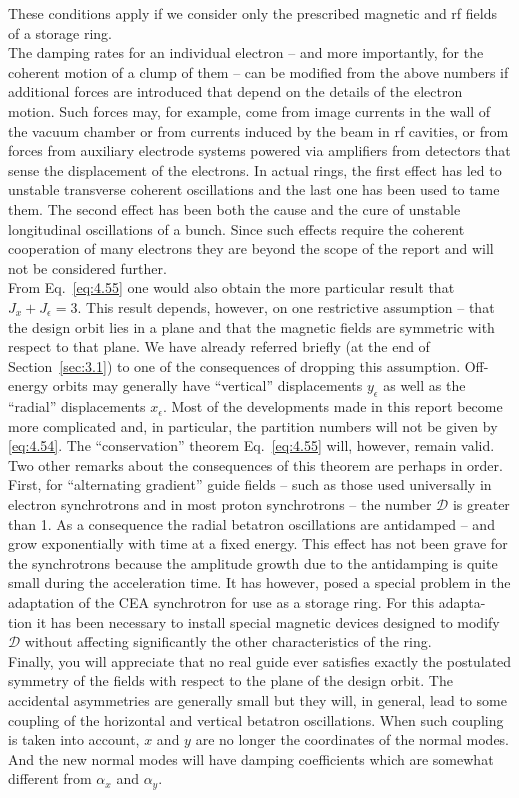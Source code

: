 \documentclass[../sands-adaptation.tex]{subfiles}
\begin{document}
 These conditions apply if we consider only the prescribed magnetic and rf fields of a storage ring.\\
The damping rates for an individual electron -- and more importantly, for the coherent motion of a clump of them -- can be modified from the above numbers if additional forces are introduced
 that depend on the details of the electron motion. Such forces may, for example, come from image currents in the wall of the vacuum chamber or from currents induced by the beam in rf cavities, or from forces from auxiliary electrode systems powered via amplifiers from detectors that sense the displacement of the electrons. In actual rings, the first effect has led to unstable transverse coherent oscillations and the last one has been used to tame them. The
second effect has been both the cause and the cure of unstable longitudinal oscillations of a bunch. Since such effects require the coherent cooperation of many electrons they are beyond the scope of the report and will not be considered further.\\
From Eq.~\eqref{eq:4.55} one would also obtain the more particular result that $J_x+ J_\epsilon = 3$. This result depends, however, on one restrictive assumption -- that the design orbit lies in a plane and that the magnetic fields are symmetric with respect to that plane. We have already referred briefly (at the end of Section~\ref{sec:3.1}) to one of the consequences of dropping this assumption. Off-energy orbits may generally have ``vertical'' displacements $y_\epsilon$ as well as the ``radial'' displacements $x_\epsilon$. Most of the developments
 made in this report become more complicated and, in particular, the partition numbers will not be given by \eqref{eq:4.54}. The ``conservation'' theorem Eq.~\eqref{eq:4.55} will, however,
 remain valid.\\
Two other remarks about the consequences of this theorem are perhaps in order. First, for ``alternating gradient'' guide fields -- such as those used universally in electron synchrotrons
 and in most proton synchrotrons -- the number $\mathscr{D}$ is greater than 1. As a consequence the radial betatron oscillations are antidamped -- and grow exponentially with time at a fixed energy. This effect has not been grave for the synchrotrons because the amplitude growth due to the antidamping is quite small during the acceleration time. It has however, posed a special problem in the adaptation of the CEA synchrotron for use as a storage ring. For this adapta-
tion it has been necessary to install special magnetic devices designed to modify $\mathscr{D}$
 without affecting significantly the other characteristics of the ring.\\
 Finally, you will appreciate that no real guide ever satisfies exactly the postulated symmetry
 of the fields with respect to the plane of the design orbit. The accidental asymmetries
 are generally small but they will, in general, lead to some coupling of the horizontal and vertical betatron oscillations. When such coupling is taken into account, $x$ and $y$ are no longer the coordinates of the normal modes. And the new normal modes will have damping coefficients which are somewhat different from $\alpha_x$ and $\alpha_y$.
\end{document}
